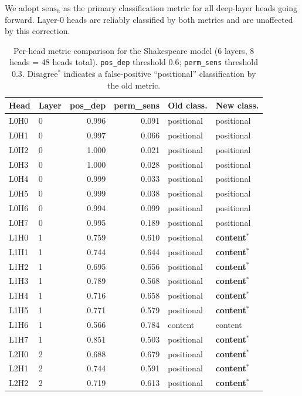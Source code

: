 We adopt $\text{sens}_h$ as the primary classification metric for all deep-layer heads
going forward. Layer-0 heads are reliably classified by both metrics and are unaffected
by this correction.

\begin{table}[p]
\centering
\caption{Per-head metric comparison for the Shakespeare model (6 layers, 8 heads = 48 heads
total). \texttt{pos\_dep} threshold 0.6; \texttt{perm\_sens} threshold 0.3.
Disagree$^*$ indicates a false-positive ``positional'' classification by the old metric.}
\label{tab:metric_shakespeare}
\small
\begin{tabular}{llrrll}
\toprule
Head & Layer & pos\_dep & perm\_sens & Old class. & New class. \\
\midrule
L0H0 & 0 & 0.996 & 0.091 & positional & positional \\
L0H1 & 0 & 0.997 & 0.066 & positional & positional \\
L0H2 & 0 & 1.000 & 0.021 & positional & positional \\
L0H3 & 0 & 1.000 & 0.028 & positional & positional \\
L0H4 & 0 & 0.999 & 0.033 & positional & positional \\
L0H5 & 0 & 0.999 & 0.038 & positional & positional \\
L0H6 & 0 & 0.994 & 0.099 & positional & positional \\
L0H7 & 0 & 0.995 & 0.189 & positional & positional \\
\midrule
L1H0 & 1 & 0.759 & 0.610 & positional & \textbf{content}$^*$ \\
L1H1 & 1 & 0.744 & 0.644 & positional & \textbf{content}$^*$ \\
L1H2 & 1 & 0.695 & 0.656 & positional & \textbf{content}$^*$ \\
L1H3 & 1 & 0.789 & 0.568 & positional & \textbf{content}$^*$ \\
L1H4 & 1 & 0.716 & 0.658 & positional & \textbf{content}$^*$ \\
L1H5 & 1 & 0.771 & 0.579 & positional & \textbf{content}$^*$ \\
L1H6 & 1 & 0.566 & 0.784 & content    & content \\
L1H7 & 1 & 0.851 & 0.503 & positional & \textbf{content}$^*$ \\
\midrule
L2H0 & 2 & 0.688 & 0.679 & positional & \textbf{content}$^*$ \\
L2H1 & 2 & 0.744 & 0.591 & positional & \textbf{content}$^*$ \\
L2H2 & 2 & 0.719 & 0.613 & positional & \textbf{content}$^*$ \\

\end{tabular}
\end{table}
